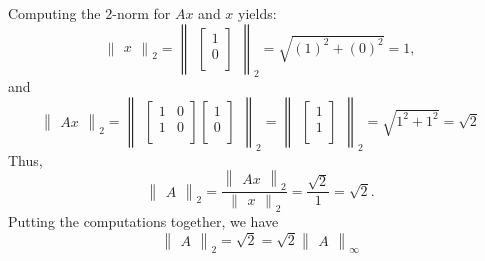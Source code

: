 \documentclass{article}
\begin{document}
Computing the $2$-norm for $Ax$ and $x$ yields:
 \[ 
    \begin{Vmatrix}
        x
    \end{Vmatrix}_2
    =
    \begin{Vmatrix}
        \begin{bmatrix}
            1\\
            0\\
        \end{bmatrix}
    \end{Vmatrix}_2
    = \sqrt{\left(1\right)^2 + \left(0\right)^2}
    = 1,
 \]
 and
 \[
    \begin{Vmatrix}
        Ax
    \end{Vmatrix}_2
    =
    \begin{Vmatrix}
        \begin{bmatrix}
            1 & 0\\
            1 & 0\\
        \end{bmatrix}
        \begin{bmatrix}
            1\\
            0\\
        \end{bmatrix}
    \end{Vmatrix}_2
    =
    \begin{Vmatrix}
        \begin{bmatrix}
            1\\
            1\\
        \end{bmatrix}
    \end{Vmatrix}_2
    = \sqrt{1^2 + 1^2}
    = \sqrt{2}
 \]
 Thus, 
 \[ 
    \begin{Vmatrix}
        A
    \end{Vmatrix}_2
    =
    \frac{
            \begin{Vmatrix}
                Ax
            \end{Vmatrix}_{2}
        }{
            \begin{Vmatrix}
                x
            \end{Vmatrix}_{2}
        } 
    =
    \frac{\sqrt{2}}{1} = \sqrt{2}.
\]
Putting the computations together, we have 
\[
    \begin{Vmatrix}
        A
    \end{Vmatrix}_2
    =
    \sqrt{2}
    =
    \sqrt{2}
    \begin{Vmatrix}
        A
    \end{Vmatrix}_\infty
\]
\end{document}
